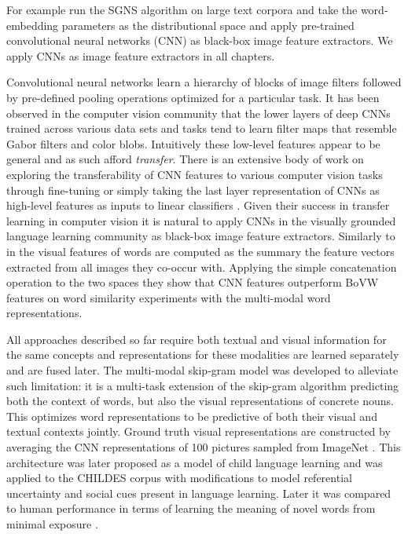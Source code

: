 For example \cite{kiela2014learning} run the SGNS algorithm
on large text corpora and take the word-embedding parameters
as the distributional space and
apply pre-trained convolutional neural networks (CNN) as black-box image
feature extractors. We apply CNNs as image feature extractors in all chapters.


Convolutional neural networks learn a hierarchy of blocks of image filters followed by
pre-defined pooling operations optimized for a particular task.
It has been observed in the computer vision community that the lower layers of
deep CNNs trained across various data sets and tasks tend to learn filter maps
that resemble Gabor filters and color blobs. Intuitively these low-level features appear to be general
and as such afford \emph{transfer}. There is an extensive body of work on exploring the transferability
of CNN features to various computer vision tasks through fine-tuning
 \citep{donahue2014decaf,oquab2014learning} or simply taking the last layer representation of CNNs
as high-level features as inputs to linear classifiers \citep{girshick2014rich,sharif2014cnn}.
Given their success in transfer learning in computer vision it is natural to apply CNNs in the
visually grounded language learning community as black-box image feature extractors.
Similarly to \cite{bruni2014multimodal} in
\cite{kiela2014learning} the visual features of words are computed as the summary the feature vectors
extracted from all images they co-occur with.
Applying the simple concatenation operation to the two spaces
they show that CNN features outperform BoVW features on word similarity
experiments with the multi-modal word representations.

All approaches described so far require both textual and visual information for the same concepts and
representations for these modalities are learned separately and are fused later.
The multi-modal skip-gram \citep{lazaridou2015combining} model was developed to alleviate such limitation:
it is a multi-task extension of the skip-gram algorithm predicting both the context of words, but also
the visual representations of concrete nouns. This optimizes word representations to be predictive of
both their visual and textual contexts jointly. Ground truth visual representations are constructed by averaging
the CNN representations \citep{krizhevsky2012imagenet} of 100 pictures sampled from ImageNet \citep{deng2009imagenet}.
This architecture was later proposed as a model of child language learning and
was applied to the CHILDES corpus \citep{macwhinney2014childes} with modifications to model referential
uncertainty and social cues \cite{lazaridou2016multimodal} present in language learning.
Later it was compared to human performance in terms of learning the meaning of novel words from minimal 
exposure  \citep{lazaridou2017multimodal}.


